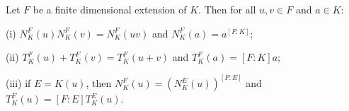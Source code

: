 Let $F$ be a finite dimensional extension of $K$. Then for all $u,v \in F$ and $a \in K$:

(i) $N_K^F(u)N_K^F(v) = N_K^F(uv)$ and $N_K^F(a) = a^{[F:K]}$;

(ii) $T_K^F(u) + T_K^F(v) = T_K^F(u+v)$ and $T_K^F(a) = [F:K]a$;

(iii) if $E = K(u)$, then $N_K^F(u) = (N_K^E(u))^{[F:E]}$ and $T_K^F(u) = [F:E]T_K^E(u)$.
